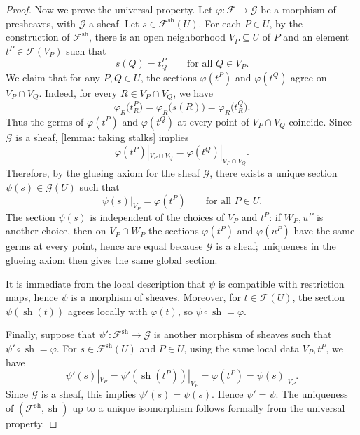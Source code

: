 \documentclass[11pt]{article}
\newcommand{\sh}{\operatorname{sh}}
\begin{document}
\begin{proof}
    Now we prove the universal property.
    Let \(\varphi:\mathscr{F}\to\mathscr{G}\) be a morphism of
    presheaves, with \(\mathscr{G}\) a sheaf.
    Let \(s \in \mathscr{F}^{\sh}(U)\).
    For each \(P \in U\), by the construction of
    \(\mathscr{F}^{\sh}\), there is an open neighborhood
    \(V_{P} \subseteq U\) of \(P\) and an element
    \(t^{P} \in \mathscr{F}(V_{P})\) such that
    \[
        s(Q) = t^{P}_{Q}
        \qquad
        \text{for all } Q \in V_{P}.
    \]
    We claim that for any \(P,Q \in U\), the sections
    \(\varphi(t^{P})\) and \(\varphi(t^{Q})\) agree on
    \(V_{P}\cap V_{Q}\). Indeed, for every
    \(R \in V_{P}\cap V_{Q}\), we have
    \[
        \varphi_{R}\bigl(t^{P}_{R}\bigr)
        =
        \varphi_{R}\bigl(s(R)\bigr)
        =
        \varphi_{R}\bigl(t^{Q}_{R}\bigr).
    \]
    Thus the germs of \(\varphi(t^{P})\) and \(\varphi(t^{Q})\)
    at every point of \(V_{P}\cap V_{Q}\) coincide.
    Since \(\mathscr{G}\) is a sheaf,
    \autoref{lemma: taking stalks} implies
    \[
        \varphi(t^{P})|_{V_{P}\cap V_{Q}}
        =
        \varphi(t^{Q})|_{V_{P}\cap V_{Q}}.
    \]
    Therefore, by the glueing axiom for the sheaf \(\mathscr{G}\),
    there exists a unique section
    \(\psi(s) \in \mathscr{G}(U)\) such that
    \[
        \psi(s)|_{V_{P}} = \varphi(t^{P})
        \qquad
        \text{for all } P \in U.
    \]
    The section \(\psi(s)\) is independent of the choices of
    \(V_{P}\) and \(t^{P}\): if \(W_{P},u^{P}\) is another choice,
    then on \(V_{P}\cap W_{P}\) the sections
    \(\varphi(t^{P})\) and \(\varphi(u^{P})\) have the same germs
    at every point, hence are equal because \(\mathscr{G}\) is a
    sheaf; uniqueness in the glueing axiom then gives the same
    global section.

    It is immediate from the local description that \(\psi\) is
    compatible with restriction maps, hence \(\psi\) is a morphism
    of sheaves. Moreover, for \(t \in \mathscr{F}(U)\), the section
    \(\psi(\sh(t))\) agrees locally with \(\varphi(t)\), so
    \(\psi\circ\sh = \varphi\).

    Finally, suppose that
    \(\psi':\mathscr{F}^{\sh}\to\mathscr{G}\) is another morphism
    of sheaves such that \(\psi'\circ\sh = \varphi\).
    For \(s \in \mathscr{F}^{\sh}(U)\) and \(P \in U\), using the
    same local data \(V_{P},t^{P}\), we have
    \[
        \psi'(s)|_{V_{P}}
        =
        \psi'(\sh(t^{P}))|_{V_{P}}
        =
        \varphi(t^{P})
        =
        \psi(s)|_{V_{P}}.
    \]
    Since \(\mathscr{G}\) is a sheaf, this implies
    \(\psi'(s)=\psi(s)\). Hence \(\psi'=\psi\).
    The uniqueness of \((\mathscr{F}^{\sh},\sh)\) up to a unique
    isomorphism follows formally from the universal property.
\end{proof}
\end{document}
